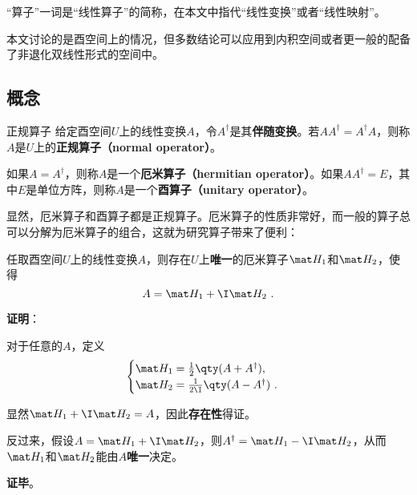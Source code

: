 

“算子”一词是“线性算子”的简称，在本文中指代“线性变换”或者“线性映射”。

本文讨论的是酉空间上的情况，但多数结论可以应用到内积空间或者更一般的配备了非退化双线性形式的空间中。

\subsection{概念}

\begin{definition}{正规算子}
给定酉空间$U$上的线性变换$A$，令$A^\dagger$是其\textbf{伴随变换}。若$AA^\dagger = A^\dagger A$，则称$A$是$U$上的\textbf{正规算子（normal operator）}。

如果$A=A^\dagger$，则称$A$是一个\textbf{厄米算子（hermitian operator）}。如果$AA^\dagger = E$，其中$E$是单位方阵，则称$A$是一个\textbf{酉算子（unitary operator）}。
\end{definition}

显然，厄米算子和酉算子都是正规算子。厄米算子的性质非常好，而一般的算子总可以分解为厄米算子的组合，这就为研究算子带来了便利：

\begin{lemma}{}
任取酉空间$U$上的线性变换$A$，则存在$U$上\textbf{唯一}的厄米算子$\mat H_1$和$\mat H_2$，使得
\begin{equation}
A = \mat H_1 + \I \mat H_2~. 
\end{equation}
\end{lemma}


\textbf{证明}：

对于任意的$A$，定义
\begin{equation}
\begin{cases}
\mat H_1 =\frac{1}{2}\qty(A+A^\dagger), \\
\mat H_2 =\frac{1}{2\I}\qty(A-A^\dagger)~. 
\end{cases}
\end{equation}

显然$\mat H_1+\I \mat H_2=A$，因此\textbf{存在性}得证。

反过来，假设$A = \mat H_1 + \I \mat H_2$，则$A^\dagger = \mat H_1 - \I \mat H_2$，从而$\mat H_1$和$\mat H_2$能由$A$\textbf{唯一}决定。

\textbf{证毕}。




